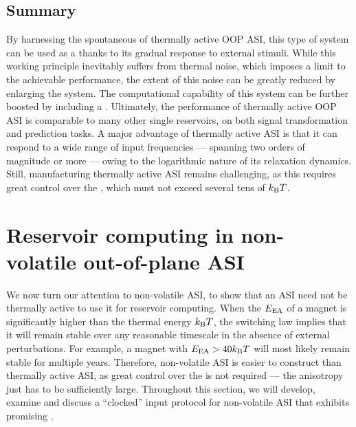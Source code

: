 \subsection{Summary}
By harnessing the spontaneous  of thermally active OOP ASI, this type of system can be used as a  thanks to its gradual response to external stimuli.
While this working principle inevitably suffers from thermal noise, which imposes a limit to the achievable performance, the extent of this noise can be greatly reduced by enlarging the system.
The computational capability of this system can be further boosted by including a .
Ultimately, the performance of thermally active OOP ASI is comparable to many other single reservoirs, on both signal transformation and prediction tasks.
A major advantage of thermally active ASI is that it can respond to a wide range of input frequencies --- spanning two orders of magnitude or more --- owing to the logarithmic nature of its relaxation dynamics.
Still, manufacturing thermally active ASI remains challenging, as this requires great control over the , which must not exceed several tens of $\kBT$.


\newpage
\section{Reservoir computing in non-volatile out-of-plane ASI}\label{sec:3:Nonvolatile}
We now turn our attention to non-volatile ASI, to show that an ASI need not be thermally active to use it for reservoir computing.
When the  $E_\mathrm{EA}$ of a magnet is significantly higher than the thermal energy $\kBT$, the  switching law implies that it will remain stable over any reasonable timescale in the absence of external perturbations.
For example, a magnet with $\EEA > 40 \kBT$ will most likely remain stable for multiple years.
Therefore, non-volatile ASI is easier to construct than thermally active ASI, as great control over the  is not required --- the anisotropy just has to be sufficiently large.
Throughout this section, we will develop, examine and discuss a ``clocked'' input protocol for non-volatile ASI that exhibits promising .

